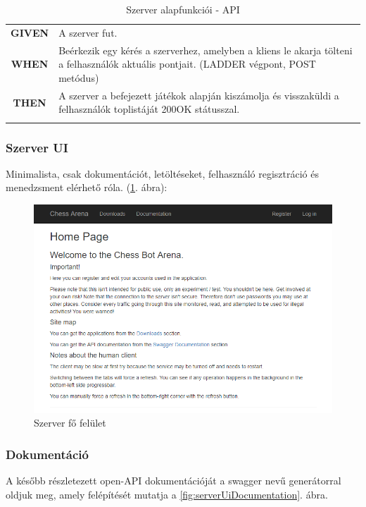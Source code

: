 \documentclass[twoside, a4paper, 12pt]{article}
\begin{document}
\begin{longtable}[c]{|c|p{14cm}|}
	\textbf{GIVEN} &
	A szerver fut.
	\\ \nobreakhline
	
	\textbf{WHEN} &
	Beérkezik egy kérés a szerverhez, amelyben a kliens le akarja tölteni a felhasználók aktuális pontjait. (LADDER végpont, POST metódus)
	\\
	\nobreakhline
	
	\textbf{THEN} &
	A szerver a befejezett játékok alapján kiszámolja és visszaküldi a felhasználók toplistáját 200OK státusszal.
	\\
	\hline
	
	\caption{Szerver alapfunkciói - API}
	\label{userStories:server:api}\\
\end{longtable} 

\subsubsection{Szerver UI}
Minimalista, csak dokumentációt, letöltéseket, felhasználó regisztráció és menedzsment elérhető róla. (\ref{fig:serverUiMainScreen}. ábra):

\begin{figure}[htbp]
	\centering
	\includegraphics[width=1.0\textwidth]{img/serverUiMainScreen.png}
	\caption{Szerver fő felület}
	\label{fig:serverUiMainScreen}
\end{figure}

\subsubsection{Dokumentáció}
A később részletezett open-API dokumentációját a swagger nevű generátorral oldjuk meg, amely felépítését mutatja a \ref{fig:serverUiDocumentation}. ábra.
\end{document}
